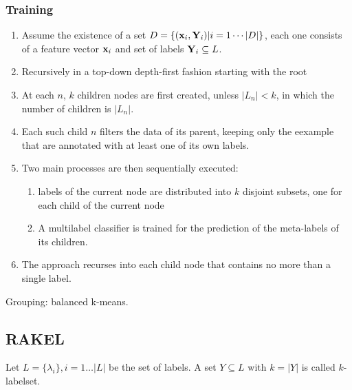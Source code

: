 \subsubsection{Training}
\begin{enumerate}
    \item Assume the existence of a set $D = \{(\mathbf{x}_i, \mathbf{Y}_i) | i = 1
        \cdots |D|\}$, each one consists of a feature vector $\mathbf{x}_i$ and
        set of labels $\mathbf{Y}_i \subseteq L$.
    \item Recursively in a top-down depth-first fashion starting with the
        root
    \item At each $n$, $k$ children nodes are first created, unless $|L_n|
        < k$, in which the number of children is $|L_n|$.
    \item Each such child $n$ filters the data of its parent, keeping only
        the eexample that are annotated with at least one of its own
        labels.
    \item Two main processes are then sequentially executed:
        \begin{enumerate}
            \item labels of the current node are distributed into $k$
                disjoint subsets, one for each child of the current node
            \item A multilabel classifier is trained for the prediction of
                the meta-labels of its children.
        \end{enumerate}
    \item The approach recurses into each child node that contains no more
        than a single label.
\end{enumerate}

Grouping: balanced k-means.

\subsection{RAKEL}
Let $L = \{\lambda_i\}, i = 1 \dots |L|$ be the set of labels. A set
$Y\subseteq L$ with $k = |Y|$ is called $k$-labelset.

